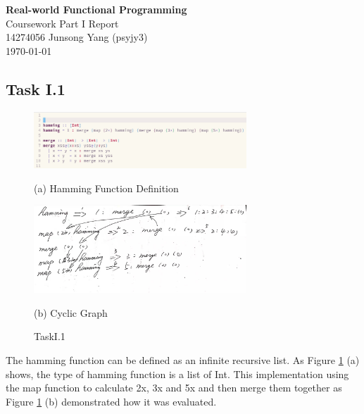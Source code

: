 \documentclass{article}
\begin{document}
\begin{center}
  \LARGE{\textbf{Real-world Functional Programming}} \\
  \Large{Coursework Part I Report} \\
  \normalsize{14274056 Junsong Yang (psyjy3)} \\
  \today
\end{center}


\begin{normalsize}
  \section{Task I.1}

  \begin{figure}[H]

    \begin{minipage}[b]{0.48\linewidth}
      \centering
      \centerline{\includegraphics[width=8.0cm]{Hamming}}
      \centerline{ (a) Hamming Function Definition}\medskip
    \end{minipage}
    \hfill
    \begin{minipage}[b]{0.48\linewidth}
      \centering
      \centerline{\includegraphics[width=8.0cm]{cyclic}}
      \centerline{ (b) Cyclic Graph}\medskip
    \end{minipage}
    \caption{TaskI.1}
    \label{fig:taskI.1}
  \end{figure}


  The hamming function can be defined as an infinite recursive list. As Figure \ref{fig:taskI.1} (a) shows, the type of hamming function is a list of Int. This implementation using the map function to calculate 2x, 3x and
  5x and then merge them together as Figure \ref{fig:taskI.1} (b) demonstrated how it was evaluated.


\end{normalsize}
\end{document}

